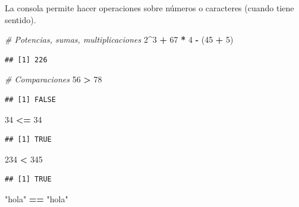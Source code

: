 \documentclass[]{article}
\newenvironment{Shaded}{\begin{snugshade}}{\end{snugshade}}
\newcommand{\DecValTok}[1]{\textcolor[rgb]{0.00,0.00,0.81}{#1}}
\newcommand{\StringTok}[1]{\textcolor[rgb]{0.31,0.60,0.02}{#1}}
\newcommand{\CommentTok}[1]{\textcolor[rgb]{0.56,0.35,0.01}{\textit{#1}}}
\newcommand{\OperatorTok}[1]{\textcolor[rgb]{0.81,0.36,0.00}{\textbf{#1}}}
\newcommand{\NormalTok}[1]{#1}
\begin{document}
La consola permite hacer operaciones sobre números o caracteres (cuando
tiene sentido).

\begin{Shaded}
\begin{Highlighting}[]
\CommentTok{# Potencias, sumas, multiplicaciones}
\DecValTok{2}\OperatorTok{^}\DecValTok{3} \OperatorTok{+}\StringTok{ }\DecValTok{67} \OperatorTok{*}\StringTok{ }\DecValTok{4} \OperatorTok{-}\StringTok{ }\NormalTok{(}\DecValTok{45} \OperatorTok{+}\StringTok{ }\DecValTok{5}\NormalTok{)}
\end{Highlighting}
\end{Shaded}

\begin{verbatim}
## [1] 226
\end{verbatim}

\begin{Shaded}
\begin{Highlighting}[]
\CommentTok{# Comparaciones}
\DecValTok{56} \OperatorTok{>}\StringTok{ }\DecValTok{78} 
\end{Highlighting}
\end{Shaded}

\begin{verbatim}
## [1] FALSE
\end{verbatim}

\begin{Shaded}
\begin{Highlighting}[]
\DecValTok{34} \OperatorTok{<=}\StringTok{ }\DecValTok{34}
\end{Highlighting}
\end{Shaded}

\begin{verbatim}
## [1] TRUE
\end{verbatim}

\begin{Shaded}
\begin{Highlighting}[]
\DecValTok{234} \OperatorTok{<}\StringTok{ }\DecValTok{345}
\end{Highlighting}
\end{Shaded}

\begin{verbatim}
## [1] TRUE
\end{verbatim}

\begin{Shaded}
\begin{Highlighting}[]
\StringTok{"hola"} \OperatorTok{==}\StringTok{ "hola"}
\end{Highlighting}
\end{Shaded}
\end{document}
